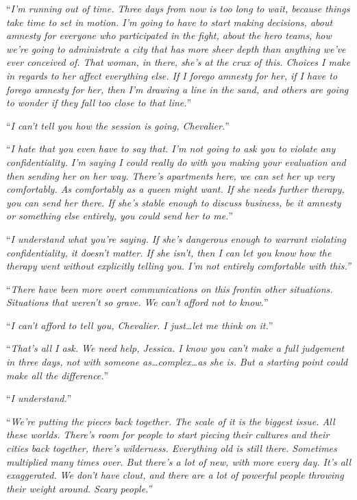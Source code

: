 ``\emph{I'm running out of time.  Three days from now is too long to wait, because things take time to set in motion.  I'm going to have to start making decisions, about amnesty for everyone who participated in the fight, about the hero teams, how we're going to administrate a city that has more sheer depth than anything we've ever conceived of.  That woman, in there, she's at the crux of this.  Choices I make in regards to her affect everything else.  If I forego amnesty for her, if I have to forego amnesty for her, then I'm drawing a line in the sand, and others are going to wonder if they fall too close to that line.}''



``\emph{I can't tell you how the session is going, Chevalier.}''



``\emph{I hate that you even have to say that.  I'm not going to ask you to violate any confidentiality.  I'm saying I could really do with you making your evaluation and then sending her on her way.  There's apartments here, we can set her up very comfortably.  As comfortably as a queen might want.  If she needs further therapy, you can send her there.  If she's stable enough to discuss business, be it amnesty or something else entirely, you could send her to me.}''



``\emph{I understand what you're saying.  If she's dangerous enough to warrant violating confidentiality, it doesn't matter.  If she isn't, then I can let you know how the therapy went without explicitly telling you.  I'm not entirely comfortable with this.''}



``\emph{There have been more overt communications on this front}\emph{in other situations.  Situations that weren't so grave.  We can't afford not to know.}''



``\emph{I can't afford to tell you, Chevalier.  I just\ldots let me think on it.}''



``\emph{That's all I ask.  We need help, Jessica.  I know you can't make a full judgement in three days, not with someone as\ldots complex\ldots as she is.  But a starting point could make all the difference.}''



``\emph{I understand.}''



``\emph{We're putting the pieces back together.  The scale of it is the biggest issue.  All these worlds.  There's room for people to start piecing their cultures and their cities back together, there's wilderness.  Everything old is still there.  Sometimes multiplied many times over.  But there's a lot of new, with more every day.  It's all exaggerated.  We don't have clout, and there are a lot of powerful people throwing their weight around.  Scary people.''}



